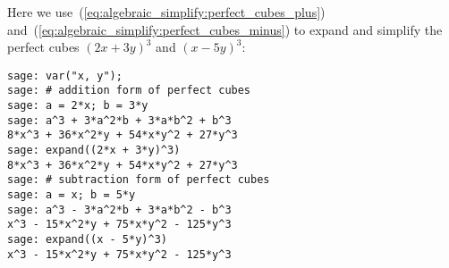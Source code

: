 Here we use~(\ref{eq:algebraic_simplify:perfect_cubes_plus})
and~(\ref{eq:algebraic_simplify:perfect_cubes_minus}) to expand and
simplify the perfect cubes $(2x + 3y)^3$ and $(x - 5y)^3$:

\begin{lstlisting}
sage: var("x, y");
sage: # addition form of perfect cubes
sage: a = 2*x; b = 3*y
sage: a^3 + 3*a^2*b + 3*a*b^2 + b^3
8*x^3 + 36*x^2*y + 54*x*y^2 + 27*y^3
sage: expand((2*x + 3*y)^3)
8*x^3 + 36*x^2*y + 54*x*y^2 + 27*y^3
sage: # subtraction form of perfect cubes
sage: a = x; b = 5*y
sage: a^3 - 3*a^2*b + 3*a*b^2 - b^3
x^3 - 15*x^2*y + 75*x*y^2 - 125*y^3
sage: expand((x - 5*y)^3)
x^3 - 15*x^2*y + 75*x*y^2 - 125*y^3
\end{lstlisting}
